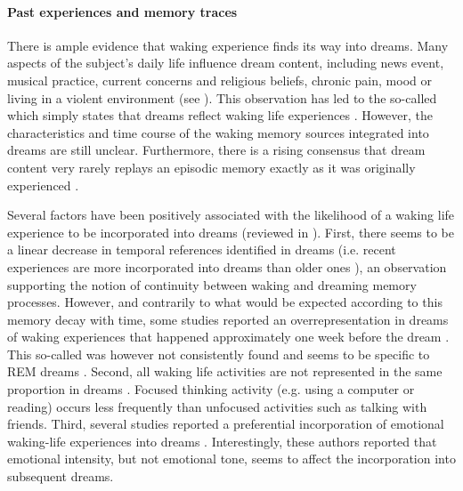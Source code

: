 \paragraph{Past experiences and memory traces}

There is ample evidence that waking experience finds its way into dreams. Many aspects of the subject’s daily life influence dream content, including news event, musical practice, current concerns and religious beliefs, chronic pain, mood or living in a violent environment (see \citealp{ruby_experimental_2011}). This observation has led to the so-called  which simply states that dreams reflect waking life experiences \citep{schredl_continuity_2003}. However, the characteristics and time course of the waking memory sources integrated into dreams are still unclear. Furthermore, there is a rising consensus that dream content very rarely replays an episodic memory exactly as it was originally experienced \citep{fosse_dreaming_2003, nielsen_what_2005}.

Several factors have been positively associated with the likelihood of a waking life experience to be incorporated into dreams (reviewed in \citealp{schredl_characteristics_2010}). First, there seems to be a linear decrease in temporal references identified in dreams (i.e. recent experiences are more incorporated into dreams than older ones \citealp{botman_dream_1990, strauch_dem_2004, grenier_temporal_2005}), an observation supporting the notion of continuity between waking and dreaming memory processes. However, and contrarily to what would be expected according to this memory decay with time, some studies reported an overrepresentation in dreams of waking experiences that happened approximately one week before the dream \citep{nielsen_day-residue_1992, marquardt_empirical_1996, blagrove_replication_2011}. This so-called  was however not consistently found and seems to be specific to REM dreams \citep{blagrove_assessing_2011, van_rijn_dream-lag_2015}. Second, all waking life activities are not represented in the same proportion in dreams \citep{hartmann_we_1996, schredl_continuity_2000}. Focused thinking activity (e.g. using a computer or reading) occurs less frequently than unfocused activities such as talking with friends. Third, several studies reported a preferential incorporation of emotional waking-life experiences into dreams \citep{malinowski_evidence_2014, schredl_factors_2006}. Interestingly, these authors reported that emotional intensity, but not emotional tone, seems to affect the incorporation into subsequent dreams.

